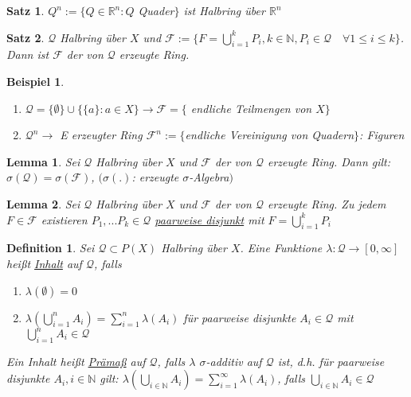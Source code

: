 \documentclass[11pt]{memoir}
\theoremstyle{changebreak}
\newtheorem{Definition}{Definition}[chapter]
\newtheorem{Beispiel}{Beispiel}[chapter]
\newtheorem{Lemma}{Lemma}[chapter]
\newtheorem{Satz}{Satz}[chapter]
\begin{document}
\begin{Satz}
$Q^n := \{Q \in \mathbb R^n: Q $ Quader$\}$ ist Halbring über $\mathbb R^n$
\end{Satz}

\begin{Satz}
$\mathscr Q$ Halbring über $X$ und $\mathscr F := \{F = \bigcup\limits_{i=1}^k P_i, k \in \mathbb N, P_i \in \mathscr Q\quad \forall 1 \leq i \leq k\}$. Dann ist $\mathscr F$ der von $\mathscr Q$ erzeugte Ring.
\end{Satz}

\begin{Beispiel}
\begin{enumerate}
	\item $\mathscr Q = \{\emptyset \} \cup \{\{a\}: a \in X\} \rightarrow \mathscr F = \{$ endliche Teilmengen von $X\}$
	\item $\mathscr Q^n \rightarrow$ E erzeugter Ring $\mathscr F^n:= \{$endliche Vereinigung von Quadern$\}$: Figuren
\end{enumerate}
\end{Beispiel}

\begin{Lemma}
Sei $\mathscr Q$ Halbring über $X$ und $\mathscr F$ der von $\mathscr Q$ erzeugte Ring. Dann gilt: $\sigma(\mathscr Q) = \sigma(\mathscr F)$, $(\sigma(.)$: erzeugte $\sigma$-Algebra$)$
\end{Lemma}

\begin{Lemma}
Sei $\mathscr Q$ Halbring über $X$ und $\mathscr F$ der von $\mathscr Q$ erzeugte Ring. Zu jedem $F \in \mathscr F$ existieren $P_1, ... P_k \in \mathscr Q$ \underline{paarweise disjunkt} mit $F = \bigcup\limits_{i=1}^k P_i$
\end{Lemma}

\begin{Definition}
Sei $\mathscr Q \subset P(X)$ Halbring über $X$. Eine Funktione $\lambda: \mathscr Q \rightarrow [0, \infty ]$ heißt \underline{Inhalt} auf $\mathscr Q$, falls
\begin{enumerate}
	\item $\lambda(\emptyset) = 0$
	\item $\lambda\left(\bigcup\limits_{i=1}^n	A_i\right) = \sum\limits_{i=1}^n \lambda(A_i)$ für paarweise disjunkte $A_i \in \mathscr Q$ mit $\bigcup\limits_{i=1}^n A_i \in \mathscr Q$
\end{enumerate}
Ein Inhalt heißt \underline{Prämaß} auf $\mathscr Q$, falls $\lambda$ $\sigma$-additiv auf $\mathscr Q$ ist, d.h. für paarweise disjunkte $A_i, i \in \mathbb N$ gilt: $\lambda\left(\bigcup\limits_{i\in \mathbb N} A_i \right) = \sum\limits_{i=1}^\infty \lambda(A_i)$, falls $\bigcup\limits_{i \in \mathbb N} A_i \in \mathscr Q$
\end{Definition}
\end{document}
